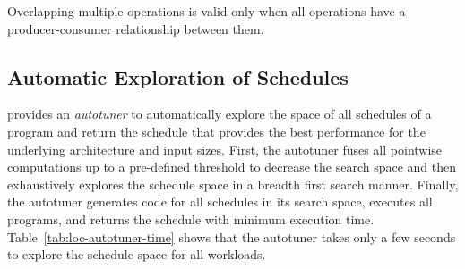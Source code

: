  Overlapping multiple operations is valid only when all operations have a producer-consumer relationship between them.


\subsection{Automatic Exploration of Schedules}
\tool provides an \emph{autotuner} to automatically explore the space of all schedules of a program and return the schedule that provides the best performance for the underlying architecture and input sizes.
First, the autotuner fuses all pointwise computations up to a pre-defined threshold to decrease the search space and then exhaustively explores the schedule space in a breadth first search manner.
Finally, the autotuner generates code for all schedules in its search space, executes all programs, and returns the schedule with minimum execution time.
Table~\ref{tab:loc-autotuner-time} shows that the autotuner takes only a few seconds to explore the schedule space for all workloads.


